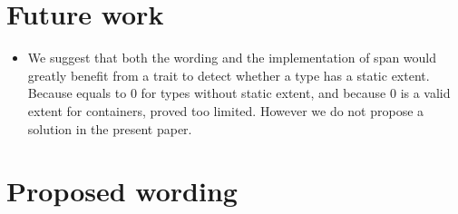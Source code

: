 \documentclass{wg21}
\begin{document}
\section{Future work}

\begin{itemize}
	\item We suggest that both the wording and the implementation of span would greatly benefit from a trait to detect whether a type has a static extent.
Because  equals to 0 for types without static extent, and because 0 is a valid extent for containers,  proved too limited. However we do not propose a solution in the present paper.
\end{itemize}

\section{Proposed wording}
\end{document}
